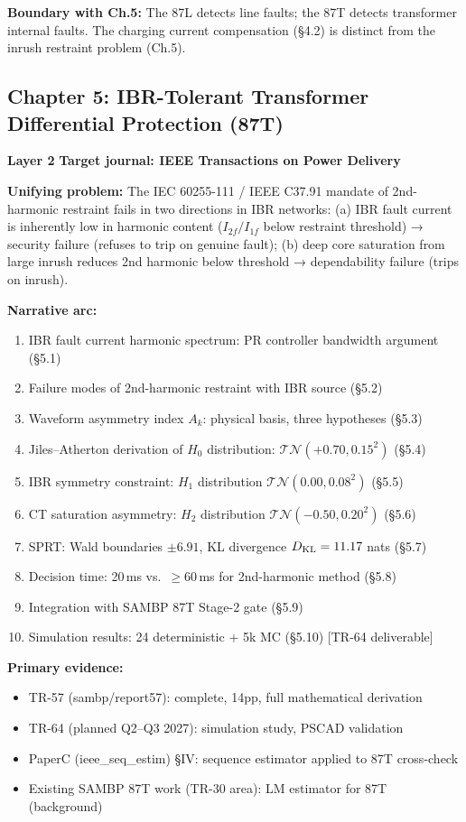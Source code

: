 \documentclass[11pt, a4paper]{article}
\newcommand{\chtag}[2]{\colorbox{#1}{\color{white}\textbf{\small #2}}}
\begin{document}
\textbf{Boundary with Ch.5:} The 87L detects line faults; the 87T detects
transformer internal faults.  The charging current compensation (§4.2) is
distinct from the inrush restraint problem (Ch.5).

\subsection{Chapter 5: IBR-Tolerant Transformer Differential Protection (87T)}

\chtag{C4col}{Layer 2} \quad \textbf{Target journal: IEEE Transactions on Power Delivery}

\textbf{Unifying problem:} The IEC 60255-111 / IEEE C37.91 mandate of 2nd-harmonic
restraint fails in two directions in IBR networks:
(a) IBR fault current is inherently low in harmonic content ($I_{2f}/I_{1f}$
below restraint threshold) → security failure (refuses to trip on genuine fault);
(b) deep core saturation from large inrush reduces 2nd harmonic below threshold
→ dependability failure (trips on inrush).

\textbf{Narrative arc:}
\begin{enumerate}[nosep]
  \item IBR fault current harmonic spectrum: PR controller bandwidth argument (§5.1)
  \item Failure modes of 2nd-harmonic restraint with IBR source (§5.2)
  \item Waveform asymmetry index $A_k$: physical basis, three hypotheses (§5.3)
  \item Jiles--Atherton derivation of $H_0$ distribution: $\mathcal{TN}(+0.70, 0.15^2)$ (§5.4)
  \item IBR symmetry constraint: $H_1$ distribution $\mathcal{TN}(0.00, 0.08^2)$ (§5.5)
  \item CT saturation asymmetry: $H_2$ distribution $\mathcal{TN}(-0.50, 0.20^2)$ (§5.6)
  \item SPRT: Wald boundaries $\pm 6.91$, KL divergence $D_{\rm KL}=11.17$ nats (§5.7)
  \item Decision time: 20\,ms vs.\ $\geq 60$\,ms for 2nd-harmonic method (§5.8)
  \item Integration with SAMBP 87T Stage-2 gate (§5.9)
  \item Simulation results: 24 deterministic + 5k MC (§5.10) [TR-64 deliverable]
\end{enumerate}

\textbf{Primary evidence:}
\begin{itemize}[nosep]
  \item TR-57 (sambp/report57): complete, 14pp, full mathematical derivation
  \item TR-64 (planned Q2--Q3 2027): simulation study, PSCAD validation
  \item PaperC (ieee\_seq\_estim) §IV: sequence estimator applied to 87T cross-check
  \item Existing SAMBP 87T work (TR-30 area): LM estimator for 87T (background)
\end{itemize}
\end{document}
